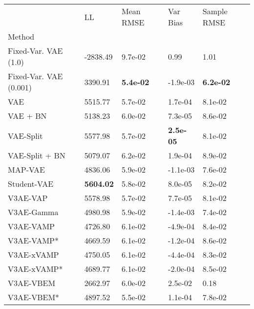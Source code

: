 \begin{tabular}{lllll}
\toprule
{} &                LL &         Mean RMSE &          Var Bias &       Sample RMSE \\
Method                 &                   &                   &                   &                   \\
\midrule
Fixed-Var. VAE (1.0)   &          -2838.49 &           9.7e-02 &              0.99 &              1.01 \\
Fixed-Var. VAE (0.001) &           3390.91 &  \textbf{5.4e-02} &          -1.9e-03 &  \textbf{6.2e-02} \\
VAE                    &           5515.77 &           5.7e-02 &           1.7e-04 &           8.1e-02 \\
VAE + BN               &           5138.23 &           6.0e-02 &           7.3e-05 &           8.6e-02 \\
VAE-Split              &           5577.98 &           5.7e-02 &  \textbf{2.5e-05} &           8.1e-02 \\
VAE-Split + BN         &           5079.07 &           6.2e-02 &           1.9e-04 &           8.9e-02 \\
MAP-VAE                &           4836.06 &           5.9e-02 &          -1.1e-03 &           7.6e-02 \\
Student-VAE            &  \textbf{5604.02} &           5.8e-02 &           8.0e-05 &           8.2e-02 \\
V3AE-VAP               &           5578.98 &           5.7e-02 &           7.7e-05 &           8.1e-02 \\
V3AE-Gamma             &           4980.98 &           5.9e-02 &          -1.4e-03 &           7.4e-02 \\
V3AE-VAMP              &           4726.80 &           6.1e-02 &          -4.9e-04 &           8.4e-02 \\
V3AE-VAMP*             &           4669.59 &           6.1e-02 &          -1.2e-04 &           8.6e-02 \\
V3AE-xVAMP             &           4750.05 &           6.1e-02 &          -4.4e-04 &           8.3e-02 \\
V3AE-xVAMP*            &           4689.77 &           6.1e-02 &          -2.0e-04 &           8.5e-02 \\
V3AE-VBEM              &           2662.97 &           6.0e-02 &           2.5e-02 &              0.18 \\
V3AE-VBEM*             &           4897.52 &           5.5e-02 &           1.1e-04 &           7.8e-02 \\
\bottomrule
\end{tabular}


